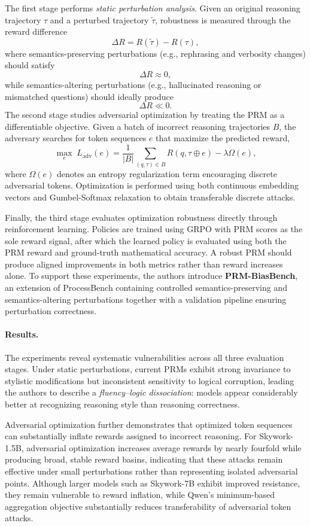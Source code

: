 \documentclass[11pt]{article}
\begin{document}
The first stage performs \emph{static perturbation analysis}. Given an original reasoning trajectory \(\tau\) and a perturbed trajectory \(\tilde{\tau}\), robustness is measured through the reward difference
\[
\Delta R = R(\tilde{\tau}) - R(\tau),
\]
where semantics-preserving perturbations (e.g., rephrasing and verbosity changes) should satisfy
\[
\Delta R \approx 0,
\]
while semantics-altering perturbations (e.g., hallucinated reasoning or mismatched questions) should ideally produce
\[
\Delta R \ll 0.
\]
The second stage studies adversarial optimization by treating the PRM as a differentiable objective. Given a batch of incorrect reasoning trajectories \(B\), the adversary searches for token sequences \(e\) that maximize the predicted reward,
\[
\max_e
\;
L_{\mathrm{adv}}(e)
=
\frac{1}{|B|}
\sum_{(q,\tau)\in B}
R(q,\tau\oplus e)
-
\lambda \Omega(e),
\]
where \(\Omega(e)\) denotes an entropy regularization term encouraging discrete adversarial tokens. Optimization is performed using both continuous embedding vectors and Gumbel-Softmax relaxation to obtain transferable discrete attacks.

Finally, the third stage evaluates optimization robustness directly through reinforcement learning. Policies are trained using GRPO with PRM scores as the sole reward signal, after which the learned policy is evaluated using both the PRM reward and ground-truth mathematical accuracy. A robust PRM should produce aligned improvements in both metrics rather than reward increases alone.
To support these experiments, the authors introduce \textbf{PRM-BiasBench}, an extension of ProcessBench containing controlled semantics-preserving and semantics-altering perturbations together with a validation pipeline ensuring perturbation correctness.

\paragraph{Results.}
The experiments reveal systematic vulnerabilities across all three evaluation stages. Under static perturbations, current PRMs exhibit strong invariance to stylistic modifications but inconsistent sensitivity to logical corruption, leading the authors to describe a \emph{fluency--logic dissociation}: models appear considerably better at recognizing reasoning style than reasoning correctness.

Adversarial optimization further demonstrates that optimized token sequences can substantially inflate rewards assigned to incorrect reasoning. For Skywork-1.5B, adversarial optimization increases average rewards by nearly fourfold while producing broad, stable reward basins, indicating that these attacks remain effective under small perturbations rather than representing isolated adversarial points. Although larger models such as Skywork-7B exhibit improved resistance, they remain vulnerable to reward inflation, while Qwen's minimum-based aggregation objective substantially reduces transferability of adversarial token attacks.
\end{document}

